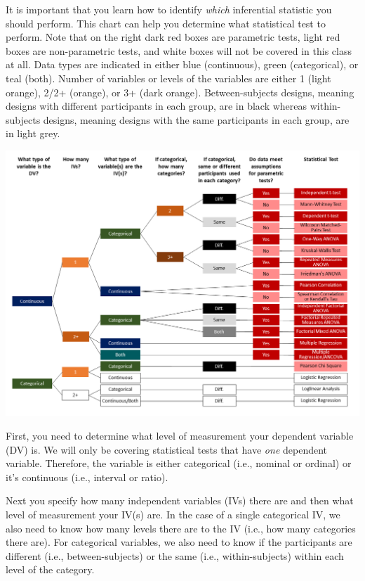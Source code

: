\documentclass[
]{book}
\begin{document}
It is important that you learn how to identify \emph{which} inferential statistic you should perform. This chart can help you determine what statistical test to perform. Note that on the right dark red boxes are parametric tests, light red boxes are non-parametric tests, and white boxes will not be covered in this class at all. Data types are indicated in either blue (continuous), green (categorical), or teal (both). Number of variables or levels of the variables are either 1 (light orange), 2/2+ (orange), or 3+ (dark orange). Between-subjects designs, meaning designs with different participants in each group, are in black whereas within-subjects designs, meaning designs with the same participants in each group, are in light grey.

\includegraphics{images/Statistical Choices.png}

First, you need to determine what level of measurement your dependent variable (DV) is. We will only be covering statistical tests that have \emph{one} dependent variable. Therefore, the variable is either categorical (i.e., nominal or ordinal) or it's continuous (i.e., interval or ratio).

Next you specify how many independent variables (IVs) there are and then what level of measurement your IV(s) are. In the case of a single categorical IV, we also need to know how many levels there are to the IV (i.e., how many categories there are). For categorical variables, we also need to know if the participants are different (i.e., between-subjects) or the same (i.e., within-subjects) within each level of the category.
\end{document}
